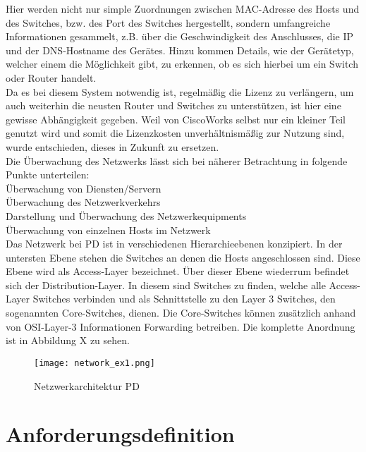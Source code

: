 Hier werden nicht nur simple Zuordnungen zwischen MAC-Adresse des Hosts und des Switches, bzw. des Port des Switches hergestellt,
sondern umfangreiche Informationen gesammelt, z.B. über die Geschwindigkeit des Anschlusses, die IP und der DNS-Hostname des Gerätes.
Hinzu kommen Details, wie der Gerätetyp, welcher einem die Möglichkeit gibt, zu erkennen, ob es sich hierbei um ein Switch oder Router handelt.\\
Da es bei diesem System notwendig ist, regelmäßig die Lizenz zu verlängern, um auch weiterhin die neusten Router und Switches zu unterstützen, ist hier eine gewisse Abhängigkeit gegeben.
Weil von CiscoWorks selbst nur ein kleiner Teil genutzt wird und somit die Lizenzkosten unverhältnismäßig zur Nutzung sind, wurde entschieden, dieses in Zukunft zu ersetzen.\\

Die Überwachung des Netzwerks lässt sich bei näherer Betrachtung in folgende Punkte unterteilen:\\
Überwachung von Diensten/Servern\\
Überwachung des Netzwerkverkehrs\\
Darstellung und Überwachung des Netzwerkequipments\\
Überwachung von einzelnen Hosts im Netzwerk\\

Das Netzwerk bei PD ist in verschiedenen Hierarchieebenen konzipiert.
In der untersten Ebene stehen die Switches an denen die Hosts angeschlossen sind. Diese Ebene wird als Access-Layer bezeichnet.
Über dieser Ebene wiederrum befindet sich der Distribution-Layer. In diesem sind Switches zu finden, welche alle Access-Layer Switches verbinden und als Schnittstelle zu den Layer 3 Switches, den sogenannten Core-Switches, dienen.
Die Core-Switches können zusätzlich anhand von OSI-Layer-3 Informationen Forwarding betreiben.
Die komplette Anordnung ist in Abbildung X zu sehen.


\begin{figure}[H]
\centering
\texttt{[image: network\_ex1.png]}
\caption{Netzwerkarchitektur PD}
\label{fig:show_s1_s2_p1_n1}
\end{figure}

\section{Anforderungsdefinition}
\label{sec:anfdef}

